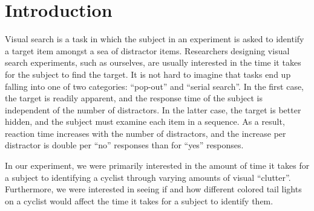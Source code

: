 \section{Introduction}

Visual search is a task in which the subject in an experiment is asked to
identify a target item amongst a sea of distractor items. Researchers designing
visual search experiments, such as ourselves, are usually interested in the time
it takes for the subject to find the target. It is not hard to imagine that
tasks end up falling into one of two categories: ``pop-out'' and ``serial
search''. In the first case, the target is readily apparent, and the response
time of the subject is independent of the number of distractors. In the latter
case, the target is better hidden, and the subject must examine each item in a
sequence. As a result, reaction time increases with the number of distractors,
and the increase per distractor is double per ``no'' responses than for ``yes''
responses. 


In our experiment, we were primarily interested in the amount of time it takes
for a subject to identifying a cyclist through varying amounts of visual
``clutter''. Furthermore, we were interested in seeing if and how different
colored tail lights on a cyclist would affect the time it takes for a subject
to identify them. 
